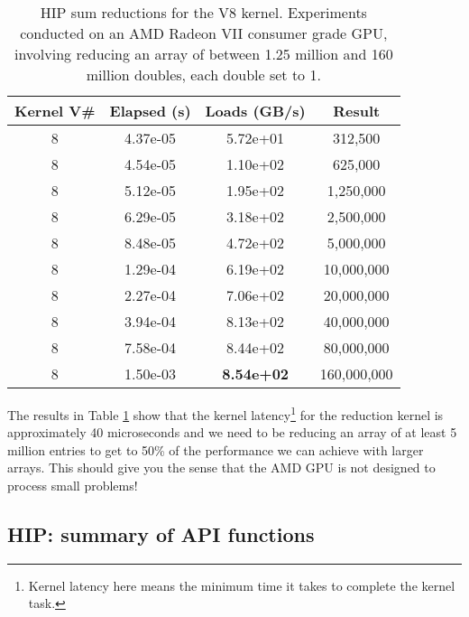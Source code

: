 \begin{table}[htbp!]
    \centering
    \begin{tabular}{c|c|c|c} \hline
    Kernel V\# & Elapsed (s) & Loads (GB/s) & Result \\ \hline
    8 &   4.37e-05 &   5.72e+01 &   312,500 \\ 
    8 &   4.54e-05 &   1.10e+02 &   625,000 \\ 
    8 &   5.12e-05 &   1.95e+02 &   1,250,000 \\ 
    8 &   6.29e-05 &   3.18e+02 &   2,500,000 \\ 
    8 &   8.48e-05 &   4.72e+02 &   5,000,000 \\ 
    8 &   1.29e-04 &   6.19e+02 &   10,000,000 \\ 
    8 &   2.27e-04 &   7.06e+02 &   20,000,000 \\ 
    8 &   3.94e-04 &   8.13e+02 &   40,000,000 \\
    8 &   7.58e-04 &   8.44e+02 &   80,000,000 \\ 
    8 &   1.50e-03 &   {\bf 8.54e+02} &   160,000,000 \\
  \hline
    \end{tabular}
    \caption{HIP sum reductions for the V8 kernel. Experiments conducted on an AMD Radeon VII consumer grade GPU, involving reducing an array of between 1.25 million and 160 million doubles, each double set to 1.}
    \label{HIPreductionsV8PerformanceRadeonVII.tab}
\end{table}

The results in Table \ref{HIPreductionsV8PerformanceRadeonVII.tab} show that the kernel latency\footnote{Kernel latency here means the minimum time it takes to complete the kernel task.} for the reduction kernel is approximately 40 microseconds and we need to be reducing an array of at least 5 million entries to get to 50\% of the performance we can achieve with larger arrays. This should give you the sense that the AMD GPU is not designed to process small problems!

\newpage
\subsection{HIP: summary of API functions}

